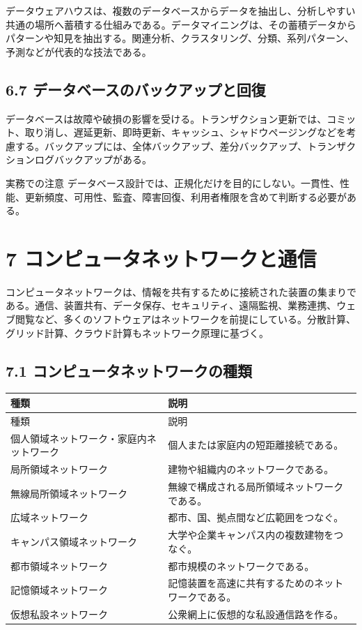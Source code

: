\documentclass[a4paper,11pt]{ltjsarticle}
\begin{document}
データウェアハウスは、複数のデータベースからデータを抽出し、分析しやすい共通の場所へ蓄積する仕組みである。データマイニングは、その蓄積データからパターンや知見を抽出する。関連分析、クラスタリング、分類、系列パターン、予測などが代表的な技法である。

\subsection{6.7 データベースのバックアップと回復}

データベースは故障や破損の影響を受ける。トランザクション更新では、コミット、取り消し、遅延更新、即時更新、キャッシュ、シャドウページングなどを考慮する。バックアップには、全体バックアップ、差分バックアップ、トランザクションログバックアップがある。

\begin{importantbox}{実務での注意}
データベース設計では、正規化だけを目的にしない。一貫性、性能、更新頻度、可用性、監査、障害回復、利用者権限を含めて判断する必要がある。

\end{importantbox}

\section{7 コンピュータネットワークと通信}

コンピュータネットワークは、情報を共有するために接続された装置の集まりである。通信、装置共有、データ保存、セキュリティ、遠隔監視、業務連携、ウェブ閲覧など、多くのソフトウェアはネットワークを前提にしている。分散計算、グリッド計算、クラウド計算もネットワーク原理に基づく。

\subsection{7.1 コンピュータネットワークの種類}

\begin{longtable}{>{\raggedright\arraybackslash}p{}>{\raggedright\arraybackslash}p{}}
\toprule
種類 & 説明 \\
\midrule
\endfirsthead
\toprule
種類 & 説明 \\
\midrule
\endhead
個人領域ネットワーク・家庭内ネットワーク & 個人または家庭内の短距離接続である。 \\
局所領域ネットワーク & 建物や組織内のネットワークである。 \\
無線局所領域ネットワーク & 無線で構成される局所領域ネットワークである。 \\
広域ネットワーク & 都市、国、拠点間など広範囲をつなぐ。 \\
キャンパス領域ネットワーク & 大学や企業キャンパス内の複数建物をつなぐ。 \\
都市領域ネットワーク & 都市規模のネットワークである。 \\
記憶領域ネットワーク & 記憶装置を高速に共有するためのネットワークである。 \\
仮想私設ネットワーク & 公衆網上に仮想的な私設通信路を作る。 \\
\bottomrule
\end{longtable}
\end{document}
